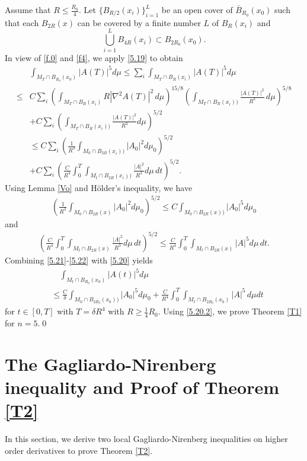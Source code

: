 \documentclass{amsart}
\theoremstyle{definition}
\numberwithin{equation}{section}
\begin{document}
Assume that $R\leq \frac {R_0}4$.
   Let $\{B_{R/2}(x_i)\}_{i=1}^L$ be an open cover of $\bar B_{R_0}(x_0)$ such that   each $B_{2R}(x)$ can be covered by a finite number $L$
   of $B_R(x_i)$ and
   $$\bigcup_{i=1}^L B_{4R}(x_i)\subset B_{2R_0}(x_0).$$
In view of \eqref{f.0} and   \eqref{f4}, we apply \eqref{5.19} to obtain
\begin{align}\label{5.20}
 &\int_{ M_T\cap  B_{R_0}(x_0)} |A(T)|^{5}d\mu\leq \sum_{i}  \int_{  M_T\cap B_{R}(x_i)} |A(T)|^{5}d\mu \\
 \leq  &C\sum_{i} \left ( \int_{  M_T\cap B_{R}(x_i)} R |\nabla^2 A(T)|^2 \,d\mu
 \right )^{15/8}\left ( \int_{ M_T\cap B_{R}(x_i))} \frac { \left| A(T) \right|^{2}} {R^3}    \,d\mu\right )^{5/8}\nonumber\\
 &+ C\sum_{i}   \left ( \int_{  M_T\cap B_{R}(x_i))} \frac { \left| A(T) \right|^{2}} {R^3} d\mu \right )^{5/2} \nonumber \\
 &\leq C\sum_{i}\left ( \frac 1{R^3}\int_{  M_0\cap B_{2R}(x_i))} \left| A_0 \right|^{2} d\mu_0 \right )^{5/2} \nonumber \\
  &+C\sum_{i} \left ( \frac C {R^4} \int_0^T \int_{  M_t\cap B_{2R}(x_i))}\frac {| A |^{2}}{R^3}
 d\mu\, dt \right )^{5/2}
\nonumber .
\end{align}
Using Lemma \ref{Vo} and H\"older's inequality, we have
\begin{align}\label{5.21}
 \left ( \frac 1{R^3}\int_{  M_0\cap B_{2R}(x)} \left| A_0 \right|^{2} d\mu_0 \right )^{5/2}\leq C \int_{  M_0\cap B_{2R}(x))} \left| A_0
 \right|^5 d\mu_0
\end{align}
and
\begin{align}\label{5.22}
  \left ( \frac C {R^4} \int_0^T \int_{  M_t\cap B_{2R}(x)}\frac {| A |^{2}}{R^3}
 d\mu\, d t \right )^{5/2} \leq     \frac C {R^4} \int_0^T \int_{  M_t\cap B_{2R}(x)}   | A |^5
 d\mu\, dt \mbox{.}
\end{align}
Combining \eqref{5.21}-\eqref{5.22} with \eqref{5.20} yields
\begin{align}\label{5.20.2}
 &\quad \int_{  M_t\cap B_{R_0}(x_0)} |A(t)|^{5}d\mu\\
 &\leq   \frac  C{\delta} \int_{  M_0\cap B_{2R_0}(x_0))}|A_0|^5 d\mu_{0}+  \frac {C} {R^4} \int_0^T\int_{  M_t\cap B_{2R_0}(x_0)}|A|^5\,d\mu dt \nonumber
\end{align}
for $t\in [0, T]$ with $T=\delta R^4$ with $R\geq \frac 14 {R_0}$. Using \eqref{5.20.2}, we  prove   Theorem  \ref{T1} for $n=5$.\qed


\section{The Gagliardo-Nirenberg  inequality and Proof of Theorem \ref{T2}}
In this section, we derive  two  local  Gagliardo-Nirenberg inequalities on higher order derivatives  to prove  Theorem  \ref{T2}.
\end{document}
